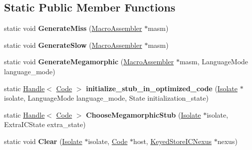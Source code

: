 \subsection*{Static Public Member Functions}
\begin{DoxyCompactItemize}
\item 
static void {\bfseries Generate\+Miss} (\hyperlink{classv8_1_1internal_1_1_macro_assembler}{Macro\+Assembler} $\ast$masm)\hypertarget{classv8_1_1internal_1_1_keyed_store_i_c_a22007a75a837a9f92c911cfefe8af694}{}\label{classv8_1_1internal_1_1_keyed_store_i_c_a22007a75a837a9f92c911cfefe8af694}

\item 
static void {\bfseries Generate\+Slow} (\hyperlink{classv8_1_1internal_1_1_macro_assembler}{Macro\+Assembler} $\ast$masm)\hypertarget{classv8_1_1internal_1_1_keyed_store_i_c_a5bf0a57d77dbb95409358f2a59f83f6e}{}\label{classv8_1_1internal_1_1_keyed_store_i_c_a5bf0a57d77dbb95409358f2a59f83f6e}

\item 
static void {\bfseries Generate\+Megamorphic} (\hyperlink{classv8_1_1internal_1_1_macro_assembler}{Macro\+Assembler} $\ast$masm, Language\+Mode language\+\_\+mode)\hypertarget{classv8_1_1internal_1_1_keyed_store_i_c_aa9c4d4eddf60cc6ef5f75fc469610e3f}{}\label{classv8_1_1internal_1_1_keyed_store_i_c_aa9c4d4eddf60cc6ef5f75fc469610e3f}

\item 
static \hyperlink{classv8_1_1internal_1_1_handle}{Handle}$<$ \hyperlink{classv8_1_1internal_1_1_code}{Code} $>$ {\bfseries initialize\+\_\+stub\+\_\+in\+\_\+optimized\+\_\+code} (\hyperlink{classv8_1_1internal_1_1_isolate}{Isolate} $\ast$isolate, Language\+Mode language\+\_\+mode, State initialization\+\_\+state)\hypertarget{classv8_1_1internal_1_1_keyed_store_i_c_a90ecd3ca5c68f270425e8fd721da4a8b}{}\label{classv8_1_1internal_1_1_keyed_store_i_c_a90ecd3ca5c68f270425e8fd721da4a8b}

\item 
static \hyperlink{classv8_1_1internal_1_1_handle}{Handle}$<$ \hyperlink{classv8_1_1internal_1_1_code}{Code} $>$ {\bfseries Choose\+Megamorphic\+Stub} (\hyperlink{classv8_1_1internal_1_1_isolate}{Isolate} $\ast$isolate, Extra\+I\+C\+State extra\+\_\+state)\hypertarget{classv8_1_1internal_1_1_keyed_store_i_c_a9a5085973a223f2a0eadedc185e31584}{}\label{classv8_1_1internal_1_1_keyed_store_i_c_a9a5085973a223f2a0eadedc185e31584}

\item 
static void {\bfseries Clear} (\hyperlink{classv8_1_1internal_1_1_isolate}{Isolate} $\ast$isolate, \hyperlink{classv8_1_1internal_1_1_code}{Code} $\ast$host, \hyperlink{classv8_1_1internal_1_1_keyed_store_i_c_nexus}{Keyed\+Store\+I\+C\+Nexus} $\ast$nexus)\hypertarget{classv8_1_1internal_1_1_keyed_store_i_c_a330251e31ea21cbcb56526c0e842c014}{}\label{classv8_1_1internal_1_1_keyed_store_i_c_a330251e31ea21cbcb56526c0e842c014}

\end{DoxyCompactItemize}

